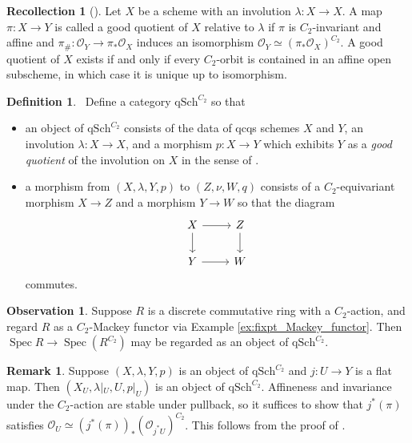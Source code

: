 \documentclass{article}
\DeclareMathOperator{\Spec}{Spec}
\theoremstyle{definition}
\newtheorem{definition}[equation]{Definition}
\newtheorem{remark}[equation]{Remark}
\newtheorem{observation}[equation]{Observation}
\newtheorem{recollection}[equation]{Recollection}
\newcommand{\Lucy}[1]{\todo[color=cyan!30]{\linespread{1}\footnotesize L: #1}}
\begin{document}
\begin{recollection} [{\cite[Remark 4.20]{azumaya_involution}}]
    Let $ X $ be a scheme with an involution $ \lambda \colon X \to X $. 
    A map $ \pi \colon X \to Y $ is called a good quotient of $ X $ relative to $ \lambda $ if $ \pi $ is $ C_2 $-invariant and affine and $ \pi_{\#} \colon \mathcal{O}_Y \to \pi_{*} \mathcal{O}_X $ induces an isomorphism $ \mathcal{O}_Y \simeq \left(\pi_{*} \mathcal{O}_X\right)^{C_2} $. 
    A good quotient of $ X $ exists if and only if every $ C_2 $-orbit is contained in an affine open subscheme, in which case it is unique up to isomorphism. 
\end{recollection}
\begin{definition}~\label{defn:Category of good quotients}
    Define a category $ \mathrm{qSch}^{C_2} $ so that
    \begin{itemize}
        \item an object of $ \mathrm{qSch}^{C_2} $ consists of the data of qcqs schemes $ X $ and $ Y $, an involution $ \lambda \colon X \to X $, and a morphism $ p \colon X \to Y $ which exhibits $ Y $ as a \emph{good quotient} of the involution on $ X $ in the sense of \cite[Remark 4.20]{azumaya_involution}. 
        \item a morphism from $ (X,\lambda, Y, p) $ to $ (Z,\nu, W, q) $ consists of a $ C_2 $-equivariant morphism $ X \to Z $ and a morphism $ Y \to W $ so that the diagram
        \begin{equation*}
        \begin{tikzcd}
            X \ar[d] \ar[r] & Z \ar[d] \\
            Y \ar[r] & W
        \end{tikzcd}
        \end{equation*}
        commutes. 
    \end{itemize}
\end{definition}
\begin{observation}\label{obs:fixpt_Mackey_functor_as_affine_C2_scheme}
    Suppose $ R $ is a discrete commutative ring with a $ C_2 $-action, and regard $ R $ as a $ C_2 $-Mackey functor via Example \ref{ex:fixpt_Mackey_functor}. 
    Then $ \Spec R \to \Spec (R^{C_2}) $ may be regarded as an object of $ \mathrm{qSch}^{C_2} $. 
\end{observation}
\begin{remark}\label{remark:restriction_of_schemes_with_involution}
    Suppose $ (X,\lambda, Y, p) $ is an object of $ \mathrm{qSch}^{C_2} $ and $ j \colon U \to Y $ is a flat map. %
    Then $ (X_U, \lambda|_U, U, p|_U) $ is an object of $ \mathrm{qSch}^{C_2} $. 
    Affineness and invariance under the $ C_2 $-action are stable under pullback, so it suffices to show that $ j^*(\pi) $ satisfies $ \mathcal{O}_U \simeq \left(j^*(\pi)\right)_*(\mathcal{O}_{j^*U})^{C_2} $. 
    This follows from the proof of \cite[Theorem 4.35(i)]{azumaya_involution}.  
\end{remark}
\end{document}
